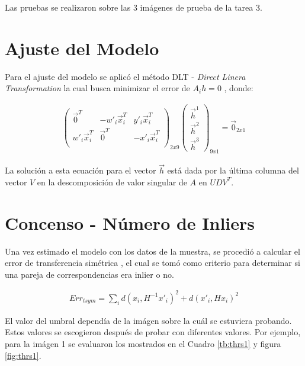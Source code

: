 \documentclass{IEEEtran}
\begin{document}
Las pruebas se realizaron sobre las 3 imágenes de prueba de la tarea 3.

\section{Ajuste del Modelo}
Para el ajuste del modelo se aplicó el método DLT - \textit{Direct Linera Transformation}
la cual busca minimizar el error de $A_i h =0$ \cite{hartley2000multiple}, donde:

\begin{equation*}
\begin{aligned}
\begin{pmatrix}
\vec{0}^T & -w'_i\vec{x}_i^T & y'_i \vec{x}_i^T \\ 
 w'_i\vec{x}_i^T & \vec{0}^T & -x'_i \vec{x}_i^T \\ 
 \end{pmatrix}_{2x9}
\left(
\begin{array}{c}
\vec{h}^1 \\
\vec{h}^2 \\
\vec{h}^3
 \end{array} 
 \right)_{9x1}
=
\vec{0}_{2x1}
\end{aligned}
\end{equation*} 

La solución a esta ecuación para el vector $\vec{h}$ está dada por la última columna
del vector $V$ en la descomposición de valor singular de $A$ en $U D V^T$.

\section{Concenso - Número de Inliers}

Una vez estimado el modelo con los datos de la muestra,
se procedió a calcular el error de transferencia simétrica \cite{hartley2000multiple},
el cual se tomó como criterio para determinar si una pareja
de correspondencias era inlier o no.

\begin{equation*}
\begin{aligned}
Err_{tsym} = \displaystyle\sum_i d(x_i, H^{-1}x'_i)^2 + d(x'_i, Hx_i)^2
\end{aligned}
\end{equation*} 

El valor del umbral dependía de la imágen sobre la cuál se estuviera
probando.
Estos valores se escogieron después de probar con
diferentes valores. Por ejemplo, para la imágen 1
se evaluaron los mostrados en el Cuadro \ref{tb:thrs1}
y figura \ref{fig:thrs1}.
\end{document}

